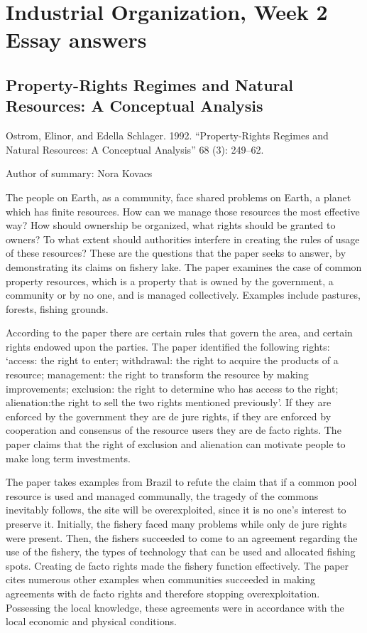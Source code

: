 \documentclass[12pt]{report}
\numberwithin{equation}{section}
\begin{document}
\section{Industrial Organization, Week 2 Essay answers}

\subsection{Property-Rights Regimes and Natural Resources: A Conceptual Analysis}

Ostrom, Elinor, and Edella Schlager. 1992. “Property-Rights Regimes and Natural Resources: A Conceptual Analysis” 68 (3): 249–62. \par

Author of summary: Nora Kovacs

The people on Earth, as a community, face shared problems on Earth, a planet which has finite resources. How can we manage those resources the most effective way? How should ownership be organized, what rights should be granted to owners? To what extent should authorities interfere in creating the rules of usage of these resources? These are the questions that the paper seeks to answer, by demonstrating its claims on fishery lake. The paper examines the case of common property resources, which is a property that is owned by  the  government,  a  community  or  by  no  one,  and  is  managed  collectively.  Examples  include pastures, forests, fishing grounds. \par

According to the paper there are certain rules that govern the area, and certain rights endowed upon the parties. The paper identified the following rights: ‘access: the right to enter; withdrawal: the right to acquire the products of a resource; management: the right to transform the resource by making improvements; exclusion: the right to determine who has access to the right; alienation:the right to sell the two rights mentioned previously’. If they are enforced by the government they are de jure rights, if they are enforced by cooperation and consensus of the resource users they are de facto rights. The paper claims that the right of exclusion and alienation can motivate people to make long term investments. \par

The paper takes examples from Brazil to refute the claim that if a common pool resource is used and  managed  communally,  the  tragedy  of  the  commons  inevitably  follows,  the  site  will  be overexploited, since it is no one's interest to preserve it. Initially, the fishery faced many problems while  only  de  jure  rights  were  present.  Then,  the  fishers  succeeded  to  come  to  an  agreement regarding the use of the fishery, the types of technology that can be used and allocated fishing spots.  Creating  de  facto  rights  made  the  fishery  function  effectively.  The  paper  cites  numerous other  examples  when  communities  succeeded  in  making  agreements  with  de  facto  rights  and therefore stopping overexploitation. Possessing the local knowledge, these agreements were in accordance with the local economic and physical conditions. \par
\end{document}
